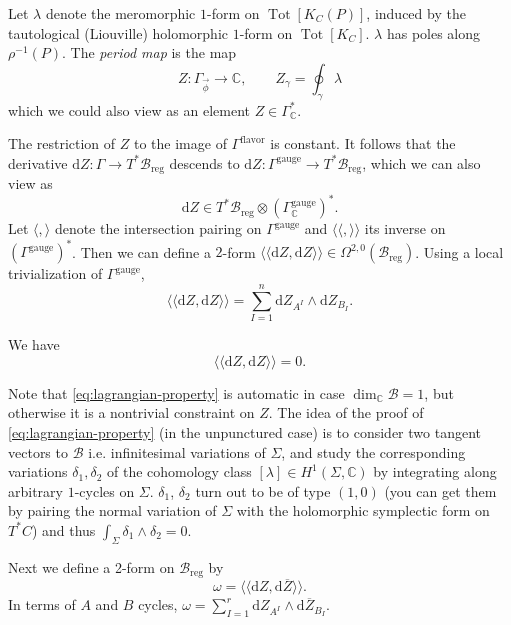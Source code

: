 \documentclass[12pt,letterpaper,reqno]{article}
\numberwithin{equation}{section}
\newcommand{\cB}{\ensuremath{\mathcal B}}
\newcommand{\C}{\ensuremath{\mathbb C}}
\newcommand{\kahler}{K\"ahler\xspace}
\newcommand{\de}{\mathrm{d}}
\newcommand{\reg}{\mathrm{reg}}
\newcommand{\gauge}{\mathrm{gauge}}
\newcommand{\flavor}{\mathrm{flavor}}
\newcommand{\IP}[1]{\langle#1\rangle}
\newcommand{\DIP}[1]{\langle\!\langle#1\rangle\!\rangle}
\newcommand{\vphi}{{\vec\phi}}
\newcommand{\ti}[1]{\textit{#1}}
\DeclareMathOperator{\rank}{rank}
\DeclareMathOperator{\Tot}{Tot}
\begin{document}
\begin{defn}
Let $\lambda$ denote the meromorphic $1$-form on $\Tot[K_C(P)]$,
induced by the tautological (Liouville) holomorphic $1$-form
on $\Tot[K_C]$.
$\lambda$ has poles along $\rho^{-1}(P)$.
The \ti{period map} is the map
\begin{equation}
   Z: \Gamma_\vphi \to \C, \qquad Z_\gamma = \oint_\gamma \lambda
\end{equation}
which we could also view as an element $Z \in \Gamma^*_\C$.
\end{defn}
The restriction of $Z$ to the image of $\Gamma^\flavor$ is constant. 
It follows that the derivative $\de Z: \Gamma \to T^* \cB_\reg$ descends to
$\de Z: \Gamma^\gauge \to T^* \cB_\reg$,
which we can also view as
\begin{equation}
  \de Z \in T^* \cB_\reg \otimes (\Gamma_\C^\gauge)^*.
\end{equation}
Let $\IP{,}$ denote the intersection pairing on $\Gamma^\gauge$
and $\DIP{,}$ its inverse on $(\Gamma^\gauge)^*$.
Then we can define a $2$-form
$\DIP{\de Z,  \de Z} \in \Omega^{2,0}(\cB_\reg)$.
Using a local trivialization of $\Gamma^\gauge$,
\begin{equation}
  \DIP{\de Z,  \de Z} = \sum_{I=1}^n \de Z_{A^I} \wedge \de Z_{B_I}.
\end{equation}


\begin{prop} We have
\begin{equation}  \label{eq:lagrangian-property}
\DIP{\de Z, \de Z} = 0.
\end{equation}
\end{prop}

Note that \eqref{eq:lagrangian-property} is automatic in case
$\dim_\C \cB = 1$, but otherwise it is a nontrivial
constraint on $Z$. The idea of the proof
of \eqref{eq:lagrangian-property} (in the unpunctured case)
is to consider two
tangent vectors to $\cB$ i.e. infinitesimal variations 
of $\Sigma$, and study the corresponding variations 
$\delta_1, \delta_2$ of 
the cohomology class $[\lambda] \in H^1(\Sigma,\C)$ 
by integrating along arbitrary
$1$-cycles on $\Sigma$. $\delta_1$, $\delta_2$ turn out to be
of type $(1,0)$
(you can get them by pairing the normal variation of $\Sigma$
with the holomorphic symplectic form on $T^* C$)
and thus
$\int_\Sigma \delta_1 \wedge \delta_2 = 0$.

\begin{defn}[Special \kahler form on $\cB_\reg$]
Next we define a 2-form on $\cB_\reg$ by
\begin{equation}
  \omega = \DIP{\de Z, \de \overline{Z}}.
\end{equation}
In terms of $A$ and $B$ cycles,
$\omega = \sum_{I = 1}^{r} \de Z_{A^I} \wedge \de \overline{Z}_{B_I}$.
\end{defn}
\end{document}
